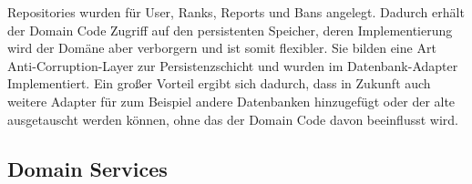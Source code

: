 Repositories wurden für User, Ranks, Reports und Bans angelegt.
Dadurch erhält der Domain Code Zugriff auf den persistenten Speicher, deren Implementierung wird der Domäne aber verborgern und ist somit flexibler.
Sie bilden eine Art Anti-Corruption-Layer zur Persistenzschicht und wurden im Datenbank-Adapter Implementiert.
Ein großer Vorteil ergibt sich dadurch, dass in Zukunft auch weitere Adapter für zum Beispiel andere Datenbanken hinzugefügt oder der alte ausgetauscht werden können,
ohne das der Domain Code davon beeinflusst wird.






\subsection{Domain Services}

